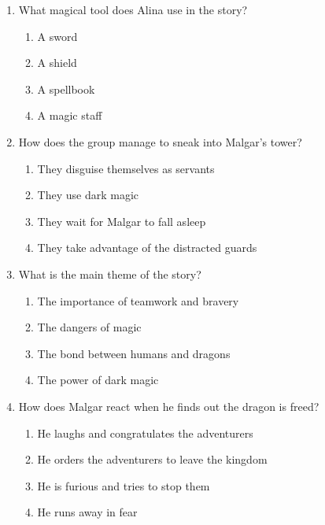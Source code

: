 \documentclass[12pt]{article}
\begin{document}
\begin{enumerate}
\item What magical tool does Alina use in the story?
\begin{enumerate}[label=\Alph*.]
    \item A sword
    \item A shield
    \item A spellbook
    \item A magic staff
\end{enumerate}

\vspace{0.5cm}

\item How does the group manage to sneak into Malgar's tower?
\begin{enumerate}[label=\Alph*.]
    \item They disguise themselves as servants
    \item They use dark magic
    \item They wait for Malgar to fall asleep
    \item They take advantage of the distracted guards
\end{enumerate}

\vspace{0.5cm}

\item What is the main theme of the story?
\begin{enumerate}[label=\Alph*.]
    \item The importance of teamwork and bravery
    \item The dangers of magic
    \item The bond between humans and dragons
    \item The power of dark magic
\end{enumerate}

\vspace{0.5cm}

\item How does Malgar react when he finds out the dragon is freed?
\begin{enumerate}[label=\Alph*.]
    \item He laughs and congratulates the adventurers
    \item He orders the adventurers to leave the kingdom
    \item He is furious and tries to stop them
    \item He runs away in fear
\end{enumerate}


\end{enumerate}
\end{document}
